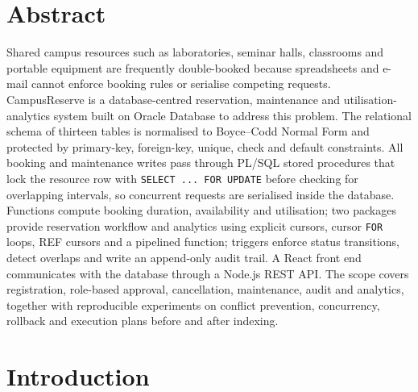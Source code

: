 \documentclass[12pt,a4paper,oneside]{report}
\renewcommand{\_}{\origus\allowbreak}
\begin{document}
\chapter*{Abstract}

Shared campus resources such as laboratories, seminar halls, classrooms and portable equipment are frequently double-booked because spreadsheets and e-mail cannot enforce booking rules or serialise competing requests. CampusReserve is a database-centred reservation, maintenance and utilisation-analytics system built on Oracle Database to address this problem. The relational schema of thirteen tables is normalised to Boyce--Codd Normal Form and protected by primary-key, foreign-key, unique, check and default constraints. All booking and maintenance writes pass through PL/SQL stored procedures that lock the resource row with \texttt{SELECT~...~FOR~UPDATE} before checking for overlapping intervals, so concurrent requests are serialised inside the database. Functions compute booking duration, availability and utilisation; two packages provide reservation workflow and analytics using explicit cursors, cursor \texttt{FOR} loops, REF cursors and a pipelined function; triggers enforce status transitions, detect overlaps and write an append-only audit trail. A React front end communicates with the database through a Node.js REST API. The scope covers registration, role-based approval, cancellation, maintenance, audit and analytics, together with reproducible experiments on conflict prevention, concurrency, rollback and execution plans before and after indexing.

\tableofcontents
\listoffigures
\listoftables

\clearpage
{}

\chapter{Introduction}
\end{document}
